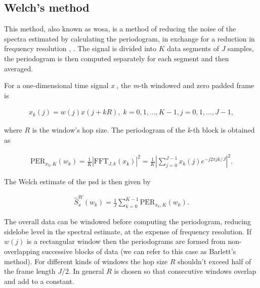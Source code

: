 	
	\subsection{Welch's method}
	
	This method, also known as \gls{wosa}, is a method of reducing the noise of the spectra estimated by calculating the periodogram, in exchange for a reduction in frequency resolution \cite{Welch_period}, \cite{Spagnolini_ch14}.
	The signal is divided into $K$ data segments of $J$ samples, the periodogram is then computed separately for each segment and then averaged.
	
	For a one-dimensional time signal \textit{x} \cite{SASPWEB2011}, the \textit{m}-th windowed and zero padded frame is
	
	\begin{align*}
		x_k(j) = w(j)x(j + kR), \; k=0,1,\ldots, K-1, j=0,1,\ldots, J-1,
	\end{align*}
	
	where $R$ is the window's hop size. The periodogram of the \textit{k}-th block is obtained as
	
	\begin{align*}
		\text{PER}_{x_k,K}(w_k) = \frac{1}{K} |\text{FFT}_{J,k}(x_k)|^2 = \frac{1}{K}\left|\sum_{j=0}^{J-1}x_k(j)e^{-j2\pi jk/J}\right|^2.
	\end{align*}
	
	The Welch estimate of the \gls{psd} is then given by
	
	\begin{align*}
		\hat{S}^W_x(w_k) = \frac{1}{J}\sum_{k=0}^{K-1}\text{PER}_{x_k,K}(w_k).
	\end{align*}
	
	The overall data can be windowed before computing the periodogram, reducing sidelobe level in the spectral estimate, at the expense of frequency resolution. If $w(j)$ is a rectangular window then the periodograms are formed from non-overlapping successive blocks of data (we can refer to this case as Barlett's method). For different kinds of windows the hop size $R$ shouldn't exceed half of the frame length $J/2$. In general $R$ is chosen so that consecutive windows overlap and add to a constant.
	
	
	

	

    
    
    